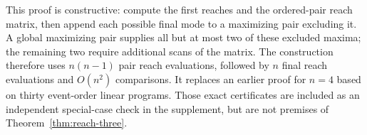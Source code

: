 This proof is constructive: compute the first reaches and the ordered-pair
reach matrix, then append each possible final mode to a maximizing pair
excluding it. A global maximizing pair supplies all but at most two of
these excluded maxima; the remaining two require additional scans of the
matrix. The construction therefore uses $n(n-1)$ pair reach evaluations,
followed by $n$ final reach evaluations and $O(n^2)$ comparisons. It
replaces an earlier proof for $n=4$ based on thirty event-order linear
programs. Those exact certificates are included as an independent
special-case check in the supplement, but are not premises of
Theorem~\ref{thm:reach-three}.
